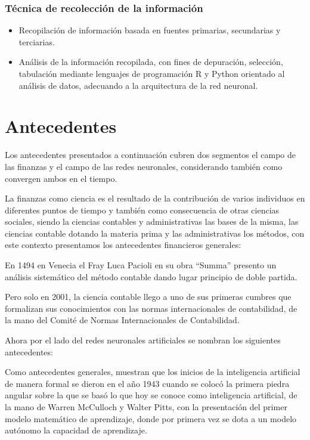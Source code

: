 \documentclass[
  12pt,
]{article}
\providecommand{\tightlist}{%
  \setlength{\itemsep}{0pt}\setlength{\parskip}{0pt}}
\begin{document}
\hypertarget{tuxe9cnica-de-recolecciuxf3n-de-la-informaciuxf3n}{%
\subsubsection{Técnica de recolección de la
información}\label{tuxe9cnica-de-recolecciuxf3n-de-la-informaciuxf3n}}

\begin{itemize}
\tightlist
\item
  Recopilación de información basada en fuentes primarias, secundarias y
  terciarias.
\item
  Análisis de la información recopilada, con fines de depuración,
  selección, tabulación mediante lenguajes de programación R y Python
  orientado al análisis de datos, adecuando a la arquitectura de la red
  neuronal.
\end{itemize}

\newpage

\hypertarget{antecedentes}{%
\section{Antecedentes}\label{antecedentes}}

Los antecedentes presentados a continuación cubren dos segmentos el
campo de las finanzas y el campo de las redes neuronales, considerando
también como convergen ambos en el tiempo.

La finanzas como ciencia es el resultado de la contribución de varios
individuos en diferentes puntos de tiempo y también como consecuencia de
otras ciencias sociales, siendo la ciencias contables y administrativas
las bases de la misma, las ciencias contable dotando la materia prima y
las administrativas los métodos, con este contexto presentamos los
antecedentes financieros generales:

En 1494 en Venecia el Fray Luca Pacioli en su obra ``Summa'' presento un
análisis sistemático del método contable dando lugar principio de doble
partida.

Pero solo en 2001, la ciencia contable llego a uno de sus primeras
cumbres que formalizan sus conocimientos con las normas internacionales
de contabilidad, de la mano del Comité de Normas Internacionales de
Contabilidad.

Ahora por el lado del redes neuronales artificiales se nombran los
siguientes antecedentes:

Como antecedentes generales, muestran que los inicios de la inteligencia
artificial de manera formal se dieron en el año 1943 cuando se colocó la
primera piedra angular sobre la que se basó lo que hoy se conoce como
inteligencia artificial, de la mano de Warren McCulloch y Walter Pitts,
con la presentación del primer modelo matemático de aprendizaje, donde
por primera vez se dota a un modelo autónomo la capacidad de
aprendizaje.
\end{document}
